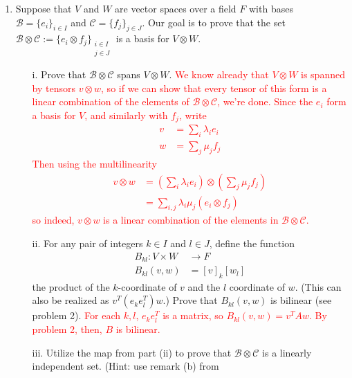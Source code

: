 \documentclass[12pt]{article}
\newcommand{\calB}{\mathcal{B}}
\newcommand{\calC}{\mathcal{C}}
\newcommand{\solution}[1]{\textcolor{red}{#1}}
\begin{document}
\begin{enumerate}
{    simply the dot product. So this is a generalization of that idea.}
\solution{
$B(v+v',w) = (v+v')^TAw = v^TAw+v'^TAw$, which holds on the other side
as well. Further, $B(\lambda v, w) = (\lambda v)^T Aw = \lambda v^T Aw
= \lambda B(v,w)$, and similarly on the other side. Hence, $B$ is
bilinear.} (This means that every inner product on $V\times W$ gives a
homomorphism $V\otimes W\rightarrow F$, and vise-versa.)
\item Suppose that $V$ and $W$ are vector spaces over a field $F$ with
  bases $\calB=\{e_i\}_{i\in I}$ and $\calC=\{f_j\}_{j\in J}$. Our goal is to
  prove that the set $\calB \otimes \calC:=\{e_i\otimes f_j\}_{\substack{i\in I\\ j\in J}}$ is a
    basis for $V\otimes W$.
    \begin{itemize}
    \item[i.] Prove that $\calB\otimes \calC$ spans $V\otimes W$. 
\solution{
We know already that $V\otimes W$ is spanned by tensors $v\otimes w$,
so if we can show that every tensor of this form is a linear
combination of the elements of $\calB\otimes \calC$, we're done. Since
the $e_i $ form a basis for $V$, and similarly with $f_j$, write
\begin{align*}
  v&= \sum_i \lambda_i e_i \\
w &= \sum_j \mu_j f_j 
\end{align*}
Then using the multilinearity
\begin{align*}
  v\otimes w &= (\sum_i \lambda_i e_i) \otimes (\sum_j \mu_j f_j) \\
&= \sum_{i,j} \lambda_i \mu_j (e_i \otimes f_j) 
\end{align*}
so indeed, $v\otimes w$ is a linear combination of the elements in
$\calB \otimes \calC$. 
}
    \item[ii.] For any pair of integers $k\in I$ and $l\in J$, define the
      function 
      \begin{align*}
        B_{kl}: V\times W &\rightarrow F\\
        B_{kl}(v,w) & = [v]_k[w_l]
      \end{align*}
the product of the $k$-coordinate of $v$ and the $l$ coordinate of
$w$. (This can also be realized as $v^T(e_ke_l^T)w$.) Prove that
$B_{kl}(v,w)$ is bilinear (see problem 2). 
\solution{For each $k,l$, $e_ke_l^T$ is a matrix, so $B_{kl}(v,w) =
  v^T A w$. By problem 2, then, $B$ is bilinear. }
\item[iii.] Utilize the map from part (ii) to prove that $\calB\otimes
  \calC$ is a linearly independent set.  (Hint: use remark (b) from

\end{itemize}
\end{enumerate}
\end{document}
